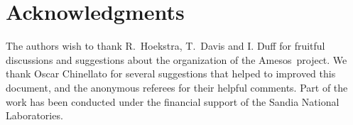 \documentclass[acmtoms,acmnow]{acmtrans2m}
\newcommand{\amesos}{{\sc Amesos}}
\begin{document}
\section*{Acknowledgments}

The authors wish to thank R.~Hoekstra, T.~Davis and I. Duff for fruitful
discussions and suggestions about the organization of the \amesos\ project. We
thank Oscar Chinellato for several suggestions that helped to improved this
document, and the anonymous referees for their helpful comments.  Part of the
work has been conducted under the financial support of the Sandia National
Laboratories.



\end{document}
